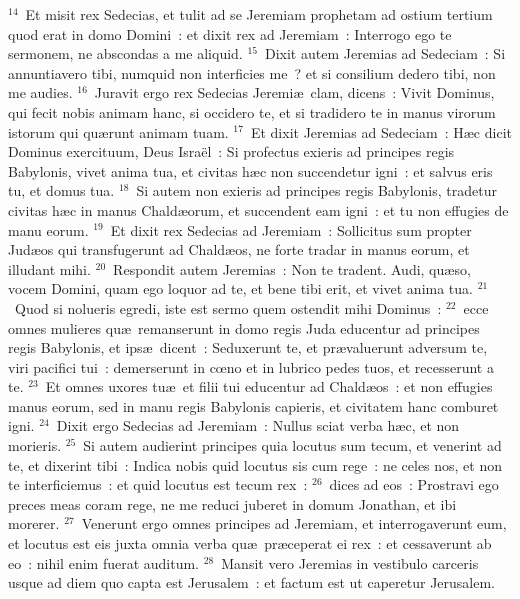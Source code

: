${}^{14}$~Et misit rex Sedecias, et tulit ad se Jeremiam prophetam ad ostium tertium quod erat in domo Domini~: et dixit rex ad Jeremiam~: Interrogo ego te sermonem, ne abscondas a me aliquid.
${}^{15}$~Dixit autem Jeremias ad Sedeciam~: Si annuntiavero tibi, numquid non interficies me~? et si consilium dedero tibi, non me audies.
${}^{16}$~Juravit ergo rex Sedecias Jeremi\ae\ clam, dicens~: Vivit Dominus, qui fecit nobis animam hanc, si occidero te, et si tradidero te in manus virorum istorum qui qu\ae runt animam tuam.
${}^{17}$~Et dixit Jeremias ad Sedeciam~: H\ae c dicit Dominus exercituum, Deus Isra\"el~: Si profectus exieris ad principes regis Babylonis, vivet anima tua, et civitas h\ae c non succendetur igni~: et salvus eris tu, et domus tua.
${}^{18}$~Si autem non exieris ad principes regis Babylonis, tradetur civitas h\ae c in manus Chald\ae orum, et succendent eam igni~: et tu non effugies de manu eorum.
${}^{19}$~Et dixit rex Sedecias ad Jeremiam~: Sollicitus sum propter Jud\ae os qui transfugerunt ad Chald\ae os, ne forte tradar in manus eorum, et illudant mihi.
${}^{20}$~Respondit autem Jeremias~: Non te tradent. Audi, qu\ae so, vocem Domini, quam ego loquor ad te, et bene tibi erit, et vivet anima tua.
${}^{21}$~Quod si nolueris egredi, iste est sermo quem ostendit mihi Dominus~:
${}^{22}$~ecce omnes mulieres qu\ae\ remanserunt in domo regis Juda educentur ad principes regis Babylonis, et ips\ae\ dicent~: Seduxerunt te, et pr\ae valuerunt adversum te, viri pacifici tui~: demerserunt in cœno et in lubrico pedes tuos, et recesserunt a te.
${}^{23}$~Et omnes uxores tu\ae\ et filii tui educentur ad Chald\ae os~: et non effugies manus eorum, sed in manu regis Babylonis capieris, et civitatem hanc comburet igni.
${}^{24}$~Dixit ergo Sedecias ad Jeremiam~: Nullus sciat verba h\ae c, et non morieris.
${}^{25}$~Si autem audierint principes quia locutus sum tecum, et venerint ad te, et dixerint tibi~: Indica nobis quid locutus sis cum rege~: ne celes nos, et non te interficiemus~: et quid locutus est tecum rex~:
${}^{26}$~dices ad eos~: Prostravi ego preces meas coram rege, ne me reduci juberet in domum Jonathan, et ibi morerer.
${}^{27}$~Venerunt ergo omnes principes ad Jeremiam, et interrogaverunt eum, et locutus est eis juxta omnia verba qu\ae\ pr\ae ceperat ei rex~: et cessaverunt ab eo~: nihil enim fuerat auditum.
${}^{28}$~Mansit vero Jeremias in vestibulo carceris usque ad diem quo capta est Jerusalem~: et factum est ut caperetur Jerusalem.

